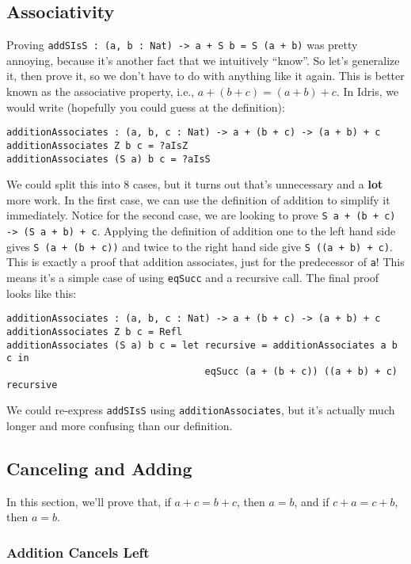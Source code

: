 \documentclass{article}
\newcommand{\inline}[1]{\texttt{#1}}
\begin{document}
\subsection{Associativity}
Proving \inline{addSIsS : (a, b : Nat) -> a + S b = S (a + b)} was pretty annoying, because it's another fact that we intuitively ``know''.
So let's generalize it, then prove it, so we don't have to do with anything like it again.
This is better known as the associative property, i.e., $a + (b + c) = (a + b) + c$.
In Idris, we would write (hopefully you could guess at the definition):

\begin{verbatim}
additionAssociates : (a, b, c : Nat) -> a + (b + c) -> (a + b) + c
additionAssociates Z b c = ?aIsZ
additionAssociates (S a) b c = ?aIsS
\end{verbatim}

We could split this into 8 cases, but it turns out that's unnecessary and a \textbf{lot} more work.
In the first case, we can use the definition of addition to simplify it immediately.
Notice for the second case, we are looking to prove \inline{S a + (b + c) -> (S a + b) + c}.
Applying the definition of addition one to the left hand side gives \inline{S (a + (b + c))} and twice to the right hand side give \inline{S ((a + b) + c)}.
This is exactly a proof that addition associates, just for the predecessor of \inline{a}!
This means it's a simple case of using \inline{eqSucc} and a recursive call.
The final proof looks like this:

\begin{verbatim}
additionAssociates : (a, b, c : Nat) -> a + (b + c) -> (a + b) + c
additionAssociates Z b c = Refl
additionAssociates (S a) b c = let recursive = additionAssociates a b c in
                                   eqSucc (a + (b + c)) ((a + b) + c) recursive
\end{verbatim}

We could re-express \inline{addSIsS} using \inline{additionAssociates}, but it's actually much longer and more confusing than our definition.

\subsection{Canceling and Adding}
In this section, we'll prove that, if $a + c = b + c$, then $a = b$, and if $c + a = c + b$, then $a = b$.

\subsubsection{Addition Cancels Left}
\end{document}
